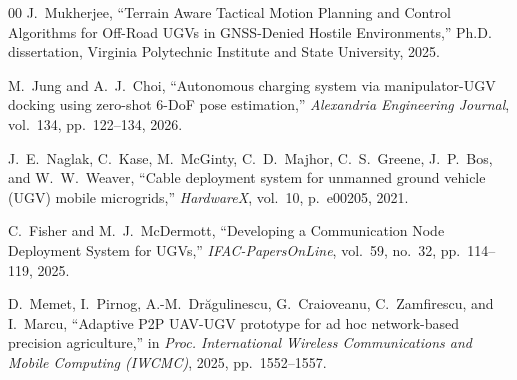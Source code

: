 \documentclass[runningheads]{llncs}
\begin{document}
\begin{thebibliography}{00}
J.~Mukherjee, ``Terrain Aware Tactical Motion Planning and Control Algorithms for Off-Road UGVs in GNSS-Denied Hostile Environments,'' Ph.D. dissertation, Virginia Polytechnic Institute and State University, 2025.

M.~Jung and A.~J.~Choi, ``Autonomous charging system via manipulator-UGV docking using zero-shot 6-DoF pose estimation,'' \textit{Alexandria Engineering Journal}, vol.~134, pp.~122--134, 2026.

J.~E.~Naglak, C.~Kase, M.~McGinty, C.~D.~Majhor, C.~S.~Greene, J.~P.~Bos, and W.~W.~Weaver, ``Cable deployment system for unmanned ground vehicle (UGV) mobile microgrids,'' \textit{HardwareX}, vol.~10, p.~e00205, 2021.

C.~Fisher and M.~J.~McDermott, ``Developing a Communication Node Deployment System for UGVs,'' \textit{IFAC-PapersOnLine}, vol.~59, no.~32, pp.~114--119, 2025.

D.~Memet, I.~Pirnog, A.-M.~Dr\u{a}gulinescu, G.~Craioveanu, C.~Zamfirescu, and I.~Marcu, ``Adaptive P2P UAV-UGV prototype for ad hoc network-based precision agriculture,'' in \textit{Proc. International Wireless Communications and Mobile Computing (IWCMC)}, 2025, pp.~1552--1557.

\end{thebibliography}
\end{document}
